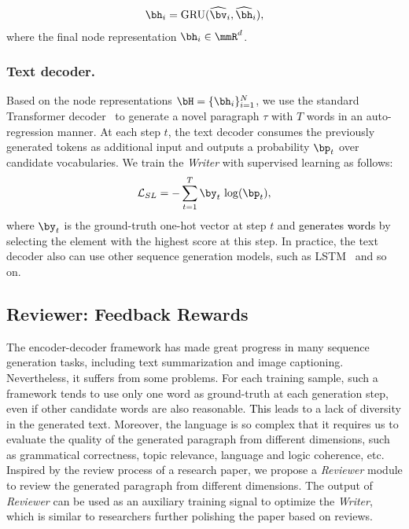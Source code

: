 \documentclass[letterpaper]{article}
\def\hmg{\textcolor{black}}
\begin{document}
\begin{equation}
    \begin{aligned}
    \bh_i = \mathrm{GRU} (\widehat{\bv}_i, \widehat{\bh}_i),
    \end{aligned}
\end{equation}
where the final node representation $\bh_i \in \mmR^{d}$.


\subsubsection{Text decoder.}

Based on the node representations $\bH=\{\bh_i\}_{i=1}^{N}$, we use the standard Transformer decoder~\cite{Vaswani2017AttentionIA} to generate a novel paragraph $\tau$ with $T$ words in an auto-regression manner. At each step $t$, the text decoder consumes the previously generated tokens as additional input and outputs a probability $\bp_t$ over candidate vocabularies. 
We train the \textit{Writer} with supervised learning as follows:
\begin{equation}
    \begin{aligned}
    \mathcal{L}_{SL} = - \sum_{t=1}^{T} \by_t \ \mathrm{log} (\bp_t),
    \label{Eq:SL loss}
    \end{aligned}
\end{equation}
where $\by_t$ is the ground-truth one-hot vector at step $t$ and \hmg{generates words} by selecting the element with the highest score at this step. In practice, the text decoder also can use other sequence generation models, such as LSTM~\cite{LSTM} and so on. 


\subsection{Reviewer: Feedback Rewards}

The encoder-decoder framework
has made great progress in many sequence generation tasks, including text summarization and image captioning. Nevertheless, it suffers from some problems. 
For each training sample, such a framework tends to use only one word as ground-truth at each generation step, even if other candidate words are also reasonable. \hmg{This} leads to a lack of diversity in the generated text.
Moreover, the language is so complex that it requires us to evaluate the quality of the generated paragraph from different dimensions, such as grammatical correctness, topic relevance, language and logic coherence, etc. Inspired by the review process of a research paper, we propose a \textit{Reviewer} module to review the generated paragraph from different dimensions. The output of \textit{Reviewer} can be used as an auxiliary training signal to optimize the \textit{Writer}, which is similar to researchers further polishing the paper based on reviews.
\end{document}
